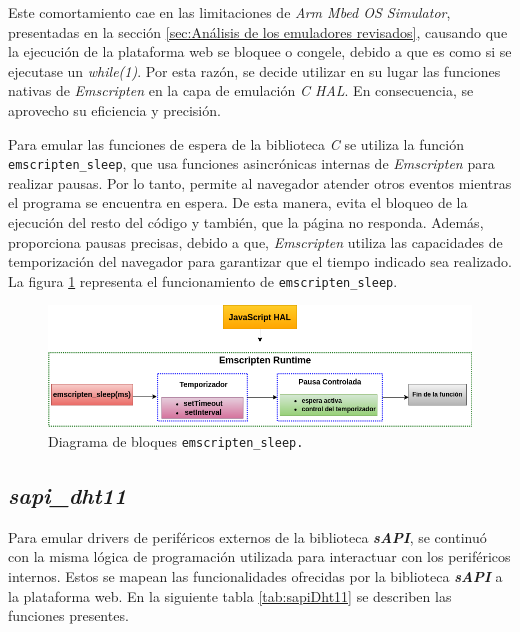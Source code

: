 Este comortamiento cae en las limitaciones de \textit{Arm Mbed OS Simulator}, presentadas en la sección \ref{sec:Análisis de los emuladores revisados}, causando que la ejecución de la plataforma web se bloquee o congele, debido a que es como si se ejecutase un \textit{while(1)}. Por esta razón, se decide utilizar en su lugar las funciones nativas de \textit{Emscripten} en la capa de emulación \textit{C HAL}. En consecuencia, se aprovecho su eficiencia y precisión.

Para emular las funciones de espera de la biblioteca \textit{C} se utiliza la función \newline \texttt{emscripten\_sleep}, que usa funciones asincrónicas internas de \textit{Emscripten} para realizar pausas. Por lo tanto, permite al navegador atender otros eventos mientras el programa se encuentra en espera. De esta manera, evita el bloqueo de la ejecución del resto del código y también, que la página no responda. Además, proporciona pausas precisas, debido a que, \textit{Emscripten} utiliza las capacidades de temporización del navegador para garantizar que el tiempo indicado sea realizado. La figura \ref{fig:emscriptenDelay} representa el funcionamiento de  \texttt{emscripten\_sleep}. 

\begin{figure}[ht]
	\centering
	\includegraphics[scale=.48]{./Figures/emscriptenDelay.png}
	\caption{Diagrama de bloques \texttt{emscripten\_sleep.}}
	\label{fig:emscriptenDelay}
\end{figure}

\newpage
\subsection{\textit{\textbf{sapi\_dht11}}}

Para emular drivers de periféricos externos de la biblioteca \textit{\textbf{sAPI}}, se continuó con la misma lógica de programación utilizada para interactuar con los periféricos internos. Estos se mapean las funcionalidades ofrecidas por la biblioteca \textit{\textbf{sAPI}} a la plataforma web. En la siguiente tabla \ref{tab:sapiDht11} se describen las funciones presentes.

